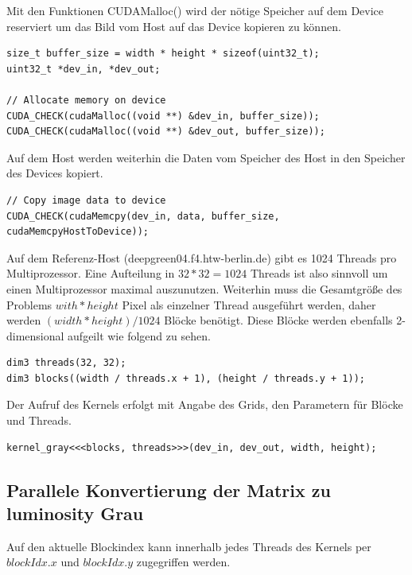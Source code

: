 \documentclass{llncs}
\begin{document}
Mit den Funktionen CUDAMalloc() wird der nötige Speicher auf dem Device reserviert um das Bild vom Host auf das Device kopieren zu können.

\begin{lstlisting}
size_t buffer_size = width * height * sizeof(uint32_t);
uint32_t *dev_in, *dev_out;

// Allocate memory on device
CUDA_CHECK(cudaMalloc((void **) &dev_in, buffer_size));
CUDA_CHECK(cudaMalloc((void **) &dev_out, buffer_size));
\end{lstlisting}

Auf dem Host werden weiterhin die Daten vom Speicher des Host in den Speicher des Devices kopiert.\\

\begin{lstlisting}[]
// Copy image data to device
CUDA_CHECK(cudaMemcpy(dev_in, data, buffer_size, cudaMemcpyHostToDevice));
\end{lstlisting}

Auf dem Referenz-Host (deepgreen04.f4.htw-berlin.de) gibt es 1024 Threads pro Multiprozessor. Eine Aufteilung in $32 * 32 = 1024$ Threads ist also sinnvoll um einen Multiprozessor maximal auszunutzen. Weiterhin muss die Gesamtgröße des Problems $with * height$ Pixel als einzelner Thread ausgeführt werden, daher werden $(width * height) / 1024$ Blöcke benötigt. Diese Blöcke werden ebenfalls 2-dimensional aufgeilt wie folgend zu sehen.

\begin{lstlisting}
dim3 threads(32, 32);
dim3 blocks((width / threads.x + 1), (height / threads.y + 1));
\end{lstlisting}

Der Aufruf des Kernels erfolgt mit Angabe des Grids, den Parametern für Blöcke und Threads.

\begin{lstlisting}
kernel_gray<<<blocks, threads>>>(dev_in, dev_out, width, height);
\end{lstlisting}


%
\subsection{Parallele Konvertierung der Matrix zu luminosity Grau}
%

Auf den aktuelle Blockindex kann innerhalb jedes Threads des Kernels per $blockIdx.x$ und $blockIdx.y$ zugegriffen werden.\\
\end{document}
